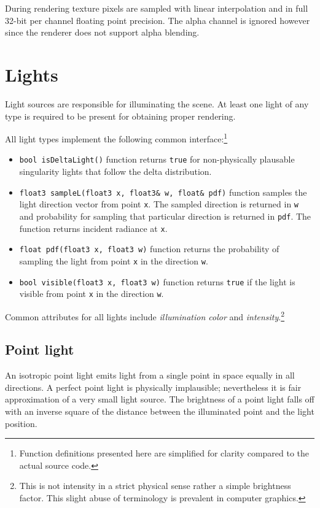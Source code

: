During rendering texture pixels are sampled with linear interpolation and in full 32-bit per channel floating point precision. The alpha channel is ignored however since the renderer does not support alpha blending.

\section{Lights}
Light sources are responsible for illuminating the scene. At least one light of any type is required to be present for obtaining proper rendering.

All light types implement the following common interface:\footnote{Function definitions presented here are simplified for clarity compared to the actual source code.}
\begin{itemize}
\item \texttt{bool isDeltaLight()} function returns \texttt{true} for non-physically plausable singularity lights that follow the delta distribution.
\item \texttt{float3 sampleL(float3 x, float3\& w, float\& pdf)} function samples the light direction vector from point \texttt{x}. The sampled direction is returned in \texttt{w} and probability for sampling that particular direction is returned in \texttt{pdf}. The function returns incident radiance at \texttt{x}.
\item \texttt{float pdf(float3 x, float3 w)} function returns the probability of sampling the light from point \texttt{x} in the direction \texttt{w}.
\item \texttt{bool visible(float3 x, float3 w)} function returns \texttt{true} if the light is visible from point \texttt{x} in the direction \texttt{w}.
\end{itemize}
Common attributes for all lights include \emph{illumination color} and \emph{intensity}.\footnote{This is not intensity in a strict physical sense rather a simple brightness factor. This slight abuse of terminology is prevalent in computer graphics.}

\subsection{Point light}
An isotropic point light emits light from a single point in space equally in all directions. A perfect point light is physically implausible; nevertheless it is fair approximation of a very small light source. The brightness of a point light falls off with an inverse square of the distance between the illuminated point and the light position.

